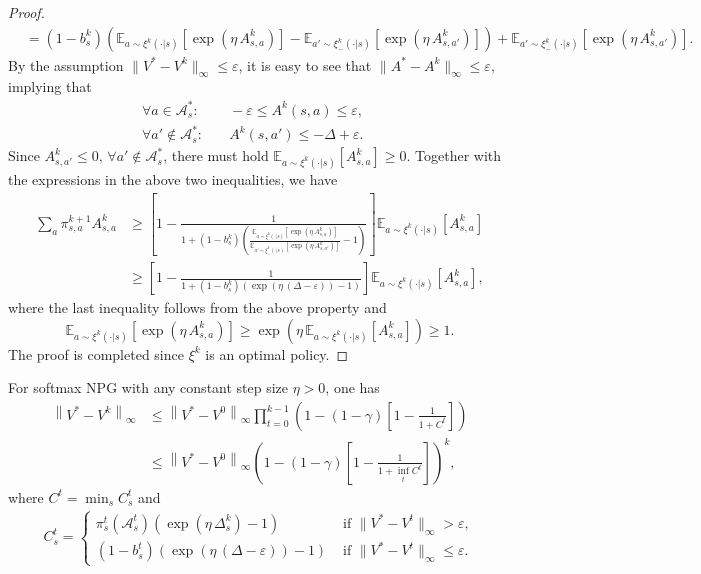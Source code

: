 \begin{proof}
\begin{align*}
&= (1-b_s^k)\left(\mathbb{E}_{a\sim\xi^k(\cdot|s)}\left[\exp\left(\eta\,A^k_{s,a}\right)\right]-\mathbb{E}_{a'\sim\xi^k_-(\cdot|s)}\left[\exp\left(\eta\,A^k_{s,a'}\right)\right]\right)+\mathbb{E}_{a'\sim\xi^k_-(\cdot|s)}\left[\exp\left(\eta\,A^k_{s,a'}\right)\right].
\end{align*}
By the assumption $\|V^*-V^k\|_\infty\leq\varepsilon$, it is easy to see that $\|A^*-A^k\|_\infty\leq\varepsilon$, implying that 
\begin{align*}
\forall a\in\mathcal{A}_s^*:&\quad -\varepsilon\leq A^k(s,a)\leq \varepsilon, \quad\\
\forall a'\not\in\mathcal{A}_s^*:&\quad A^k(s,a')\leq -\Delta+\varepsilon.
\end{align*}
Since $A^k_{s,a'}\leq 0,\,\forall a'\not\in\mathcal{A}_s^*$,  there must hold $\mathbb{E}_{a\sim \xi^k(\cdot|s)}\left[A^k_{s,a}\right]\geq 0$.
Together with the expressions in the above two inequalities, we have 
\begin{align*}
\sum_a\pi^{k+1}_{s,a}A^k_{s,a}&\geq \left[1-
\frac{1}{1+(1-b_s^k)\left(\frac{\mathbb{E}_{a\sim\xi^k(\cdot|s)}\left[\exp\left(\eta\,A^k_{s,a}\right)\right]}{\mathbb{E}_{a'\sim\xi^k_-(\cdot|s)}\left[\exp\left(\eta\,A^k_{s,a'}\right)\right]}-1\right)}\right]\mathbb{E}_{a\sim\xi^k(\cdot|s)}\left[A^k_{s,a}\right]\\
&\geq  \left[1-\frac{1}{1+(1-b_s^k)\left(\exp(\eta\,(\Delta-\varepsilon))-1\right)}\right]\mathbb{E}_{a\sim\xi^k(\cdot|s)}\left[A^k_{s,a}\right],
\end{align*}
where the last inequality follows from the above property and $$\mathbb{E}_{a\sim\xi^k(\cdot|s)}\left[\exp\left(\eta\,A^k_{s,a}\right)\right]\geq \exp\left(\eta\,\mathbb{E}_{a\sim \xi^k(\cdot|s)}\left[A^k_{s,a}\right]\right)\geq 1.$$ The proof is completed since $\xi^k$ is an optimal policy.
\end{proof}
\begin{theorem}\label{thm:softmaxNPG-global-linear}
    For softmax NPG with any constant step size $\eta>0$, one has
    \begin{align*}
\left\|V^*-V^k\right\|_\infty&\leq \left\|V^*-V^0\right\|_\infty\prod_{t=0}^{k-1}\left(1-(1-\gamma)\left[1-\frac{1}{1+C^t}\right]\right)\\
&\leq \left\|V^*-V^0\right\|_\infty\left(1-(1-\gamma)\left[1-\frac{1}{1+\inf_t C^t}\right]\right)^k,
\end{align*}
where $C^t=\min_s C_s^t$ and 
\begin{align*}
C_s^t=\begin{cases}
\pi_s^t(\mathcal{A}_s^t)\left(\exp\left(\eta\,\Delta_s^k\right)-1\right)&\mbox{ if }\|V^*-V^t\|_\infty> \varepsilon,\\
(1-b_s^t)\left(\exp(\eta\,(\Delta-\varepsilon))-1\right) & \mbox{ if }\|V^*-V^t\|_\infty\leq \varepsilon.
\end{cases}
\end{align*}
\end{theorem}

